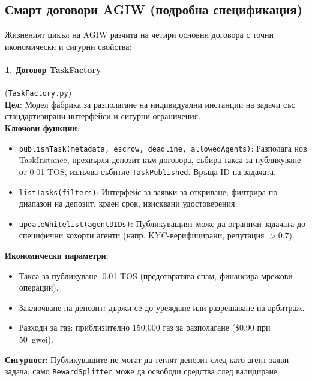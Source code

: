 \documentclass[11pt]{article}
\begin{document}
\subsection{Смарт договори AGIW (подробна спецификация)}
\label{sec:agiw-contracts}
Жизненият цикъл на AGIW разчита на четири основни договора с точни икономически и сигурни свойства:

\paragraph{1. Договор TaskFactory} (\texttt{TaskFactory.py})\\
\textbf{Цел}: Модел фабрика за разполагане на индивидуални инстанции на задачи със стандартизирани интерфейси и сигурни ограничения.\\
\textbf{Ключови функции}:
\begin{itemize}[noitemsep]
  \item \texttt{publishTask(metadata, escrow, deadline, allowedAgents)}: Разполага нов TaskInstance, прехвърля депозит към договора, събира такса за публикуване от 0.01 TOS, излъчва събитие \texttt{TaskPublished}. Връща ID на задачата.
  \item \texttt{listTasks(filters)}: Интерфейс за заявки за откриване; филтрира по диапазон на депозит, краен срок, изисквани удостоверения.
  \item \texttt{updateWhitelist(agentDIDs)}: Публикуващият може да ограничи задачата до специфични кохорти агенти (напр. KYC-верифицирани, репутация $>0.7$).
\end{itemize}
\textbf{Икономически параметри}:
\begin{itemize}[noitemsep]
  \item Такса за публикуване: 0.01 TOS (предотвратява спам, финансира мрежови операции).
  \item Заключване на депозит: държи се до уреждане или разрешаване на арбитраж.
  \item Разходи за газ: приблизително 150,000 газ за разполагане (\$0.90 при 50~gwei).
\end{itemize}
\textbf{Сигурност}: Публикуващите не могат да теглят депозит след като агент заяви задача; само \texttt{RewardSplitter} може да освободи средства след валидиране.
\end{document}
